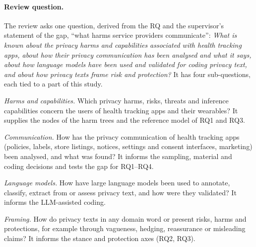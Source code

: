 \paragraph{Review question.} The review asks one question, derived from the RQ
and the supervisor's statement of the gap, \enquote{what harms service providers
communicate}: \emph{What is known about the privacy harms and capabilities
associated with health tracking apps, about how their privacy communication has
been analysed and what it says, about how language models have been used and
validated for coding privacy text, and about how privacy texts frame risk and
protection?} It has four sub-questions, each tied to a part of this study.
\begin{description}[leftmargin=1.5em,itemsep=1pt,topsep=3pt,labelindent=0pt,font=\normalfont\bfseries]
  \item[LQ1] \textit{Harms and capabilities.} Which privacy harms, risks, threats
    and inference capabilities concern the users of health tracking apps and
    their wearables? It supplies the nodes of the harm trees and the reference
    model of RQ1 and RQ3.
  \item[LQ2] \textit{Communication.} How has the privacy communication of health
    tracking apps (policies, labels, store listings, notices, settings and
    consent interfaces, marketing) been analysed, and what was found? It informs
    the sampling, material and coding decisions and tests the gap for RQ1--RQ4.
  \item[LQ3] \textit{Language models.} How have large language models been used
    to annotate, classify, extract from or assess privacy text, and how were
    they validated? It informs the LLM-assisted coding.
  \item[LQ4] \textit{Framing.} How do privacy texts in any domain word or present
    risks, harms and protections, for example through vagueness, hedging,
    reassurance or misleading claims? It informs the stance and protection axes
    (RQ2, RQ3).
\end{description}

